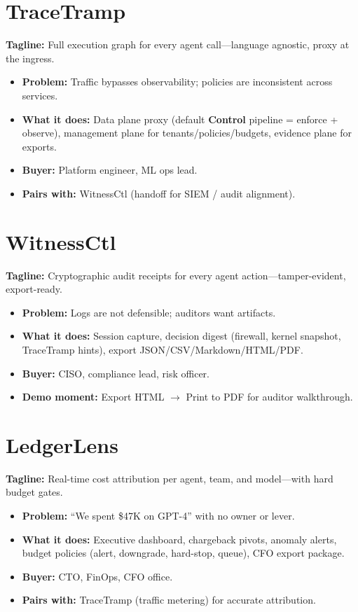 \section{TraceTramp \statusship}

\textbf{Tagline:} Full execution graph for every agent call---language agnostic, proxy at the ingress.

\begin{itemize}
  \item \textbf{Problem:} Traffic bypasses observability; policies are inconsistent across services.
  \item \textbf{What it does:} Data plane proxy (default \textbf{Control} pipeline = enforce + observe), management plane for tenants/policies/budgets, evidence plane for exports.
  \item \textbf{Buyer:} Platform engineer, ML ops lead.
  \item \textbf{Pairs with:} WitnessCtl (handoff for SIEM / audit alignment).
\end{itemize}

\section{WitnessCtl \statusship}

\textbf{Tagline:} Cryptographic audit receipts for every agent action---tamper-evident, export-ready.

\begin{itemize}
  \item \textbf{Problem:} Logs are not defensible; auditors want artifacts.
  \item \textbf{What it does:} Session capture, decision digest (firewall, kernel snapshot, TraceTramp hints), export JSON/CSV/Markdown/HTML/PDF.
  \item \textbf{Buyer:} CISO, compliance lead, risk officer.
  \item \textbf{Demo moment:} Export HTML $\rightarrow$ Print to PDF for auditor walkthrough.
\end{itemize}

\section{LedgerLens \statusship}

\textbf{Tagline:} Real-time cost attribution per agent, team, and model---with hard budget gates.

\begin{itemize}
  \item \textbf{Problem:} ``We spent \$47K on GPT-4'' with no owner or lever.
  \item \textbf{What it does:} Executive dashboard, chargeback pivots, anomaly alerts, budget policies (alert, downgrade, hard-stop, queue), CFO export package.
  \item \textbf{Buyer:} CTO, FinOps, CFO office.
  \item \textbf{Pairs with:} TraceTramp (traffic metering) for accurate attribution.
\end{itemize}

